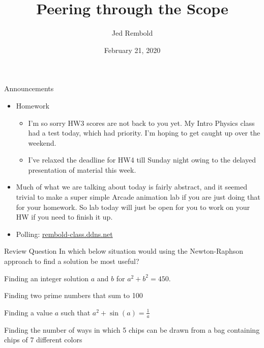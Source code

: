 \documentclass[pdf, aspectratio=169, 12pt]{beamer}
\title{Peering through the Scope}
\author{Jed Rembold}
\date{February 21, 2020}
\begin{document}
\begin{frame}{Announcements}
	\begin{itemize}
		\item Homework
			\begin{itemize}
				\item I'm so sorry HW3 scores are not back to you yet. My Intro Physics class had a test today, which had priority. I'm hoping to get caught up over the weekend.
				\item I've relaxed the deadline for HW4 till Sunday night owing to the delayed presentation of material this week.
			\end{itemize}
		\item Much of what we are talking about today is fairly abstract, and it seemed trivial to make a super simple Arcade animation lab if you are just doing that for your homework. So lab today will just be open for you to work on your HW if you need to finish it up.
		\item Polling: \url{rembold-class.ddns.net}
	\end{itemize}
\end{frame}

\begin{frame}{Review Question}
	In which below situation would using the Newton-Raphson approach to find a solution be most useful?
	\begin{poll}
		\item Finding an integer solution $a$ and $b$ for $a^2 + b^2 = 450$. 
		\item Finding two prime numbers that sum to 100
		\item Finding a value $a$ such that $a^2+\sin(a) = \frac{1}{a}$
		\item Finding the number of ways in which 5 chips can be drawn from a bag containing chips of 7 different colors
	\end{poll}
\end{frame}

		
\end{document}
